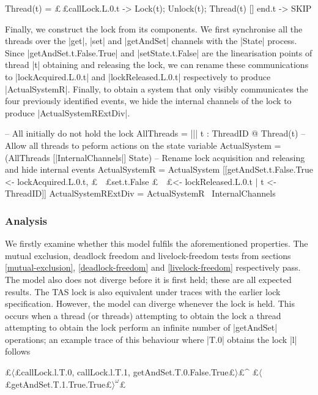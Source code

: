 \begin{cspm}
  Thread(t) =   £$\,$£callLock.L.0.t -> Lock(t); Unlock(t); Thread(t)
              [] end.t -> SKIP
\end{cspm}

Finally, we construct the lock from its components. We first synchronise all the threads over the |get|, |set| and |getAndSet| channels with the |State| process. Since |getAndSet.t.False.True| and |setState.t.False| are the linearisation points of thread |t| obtaining and releasing the lock, we can rename these communications to |lockAcquired.L.0.t| and |lockReleased.L.0.t| respectively to produce |ActualSystemR|. Finally, to obtain a system that only visibly communicates the four previously identified events, we hide the internal channels of the lock to produce |ActualSystemRExtDiv|.


\begin{cspm}
  -- All initially do not hold the lock
  AllThreads = ||| t : ThreadID @ Thread(t)
  -- Allow all threads to peform actions on the state variable
  ActualSystem = (AllThreads [|InternalChannels|] State)
  -- Rename lock acquisition and releasing and hide internal events
  ActualSystemR = ActualSystem 
                    [[getAndSet.t.False.True <- lockAcquired.L.0.t, 
                     £$\!\!\:\:\!\!\:\!\:$£set.t.False            £$\!\!\:\:\!\!\:\!\;$£<- lockReleased.L.0.t  | t <- ThreadID]]
  ActualSystemRExtDiv = ActualSystemR \ InternalChannels
\end{cspm}

\subsubsection{Analysis}

We firstly examine whether this model fulfils the aforementioned properties. The mutual exclusion, deadlock freedom and livelock-freedom tests from sections \ref{mutual-exclusion}, \ref{deadlock-freedom} and \ref{livelock-freedom} respectively pass. The model also does not diverge before it is first held; these are all expected results. The TAS lock is also equivalent under traces with the earlier lock specification. However, the model can diverge whenever the lock is held. This occurs when a thread (or threads) attempting to obtain the lock a thread attempting to obtain the lock perform an infinite number of |getAndSet| operations; an example trace of this behaviour where |T.0| obtains the lock |l| follows
\begin{cspm}
  £$\langle$£callLock.l.T.0, callLock.l.T.1, getAndSet.T.0.False.True£$\rangle$£^
    £$\langle$£getAndSet.T.1.True.True£$\rangle^\omega$£
\end{cspm}
  
